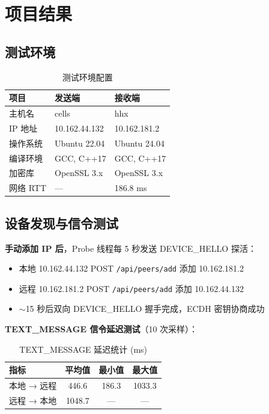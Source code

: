 \documentclass[12pt]{article}
\begin{document}
\section{项目结果}

\subsection{测试环境}

\begin{table}[H]
\centering
\caption{测试环境配置}
\begin{tabular}{lll}
\toprule
\textbf{项目} & \textbf{发送端} & \textbf{接收端} \\
\midrule
主机名 & cells & hhx \\
IP 地址 & 10.162.44.132 & 10.162.181.2 \\
操作系统 & Ubuntu 22.04 & Ubuntu 24.04 \\
编译环境 & GCC, C++17 & GCC, C++17 \\
加密库 & OpenSSL 3.x & OpenSSL 3.x \\
网络 RTT & — & 186.8 ms \\
\bottomrule
\end{tabular}
\end{table}

\subsection{设备发现与信令测试}

\textbf{手动添加 IP 后}，Probe 线程每 5 秒发送 DEVICE\_HELLO 探活：
\begin{itemize}
    \item 本地 10.162.44.132 POST \texttt{/api/peers/add} 添加 10.162.181.2
    \item 远程 10.162.181.2 POST \texttt{/api/peers/add} 添加 10.162.44.132
    \item $\sim$15 秒后双向 DEVICE\_HELLO 握手完成，ECDH 密钥协商成功
\end{itemize}

\textbf{TEXT\_MESSAGE 信令延迟测试}（10 次采样）：

\begin{table}[H]
\centering
\caption{TEXT\_MESSAGE 延迟统计 (ms)}
\begin{tabular}{lccc}
\toprule
\textbf{指标} & \textbf{平均值} & \textbf{最小值} & \textbf{最大值} \\
\midrule
本地 → 远程 & 446.6 & 186.3 & 1033.3 \\
远程 → 本地 & 1048.7 & — & — \\
\bottomrule
\end{tabular}
\end{table}
\end{document}
